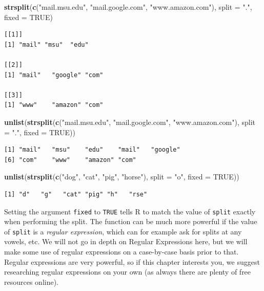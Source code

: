 \documentclass[
]{krantz}
\makeatletter
\newenvironment{Shaded}{\begin{snugshade}}{\end{snugshade}}
\newcommand{\DataTypeTok}[1]{\textcolor[rgb]{0.27,0.27,0.27}{#1}}
\newcommand{\KeywordTok}[1]{\textcolor[rgb]{0.27,0.27,0.27}{\textbf{#1}}}
\newcommand{\NormalTok}[1]{#1}
\newcommand{\OtherTok}[1]{\textcolor[rgb]{0.37,0.37,0.37}{#1}}
\newcommand{\StringTok}[1]{\textcolor[rgb]{0.5,0.5,0.5}{#1}}
\newenvironment{kframe}{%
\medskip{}
\setlength{\fboxsep}{.8em}
 \def\at@end@of@kframe{}%
 \ifinner\ifhmode%
  \def\at@end@of@kframe{\end{minipage}}%
  \begin{minipage}{\columnwidth}%
 \fi\fi%
 \def\FrameCommand##1{\hskip\@totalleftmargin \hskip-\fboxsep
 \colorbox{shadecolor}{##1}\hskip-\fboxsep
     \hskip-\linewidth \hskip-\@totalleftmargin \hskip\columnwidth}%
 \MakeFramed {\advance\hsize-\width
   \@totalleftmargin\z@ \linewidth\hsize
   \@setminipage}}%
 {\par\unskip\endMakeFramed%
 \at@end@of@kframe}
\renewenvironment{Shaded}{\begin{kframe}}{\end{kframe}}
\makeatother
\begin{document}
\begin{Shaded}
\begin{Highlighting}[]
\KeywordTok{strsplit}\NormalTok{(}\KeywordTok{c}\NormalTok{(}\StringTok{"mail.msu.edu"}\NormalTok{, }\StringTok{"mail.google.com"}\NormalTok{, }\StringTok{"www.amazon.com"}\NormalTok{),}
         \DataTypeTok{split =} \StringTok{"."}\NormalTok{, }\DataTypeTok{fixed =} \OtherTok{TRUE}\NormalTok{)}
\end{Highlighting}
\end{Shaded}

\begin{verbatim}
[[1]]
[1] "mail" "msu"  "edu" 

[[2]]
[1] "mail"   "google" "com"   

[[3]]
[1] "www"    "amazon" "com"   
\end{verbatim}

\begin{Shaded}
\begin{Highlighting}[]
\KeywordTok{unlist}\NormalTok{(}\KeywordTok{strsplit}\NormalTok{(}\KeywordTok{c}\NormalTok{(}\StringTok{"mail.msu.edu"}\NormalTok{, }\StringTok{"mail.google.com"}\NormalTok{, }\StringTok{"www.amazon.com"}\NormalTok{),}
                \DataTypeTok{split =} \StringTok{"."}\NormalTok{, }\DataTypeTok{fixed =} \OtherTok{TRUE}\NormalTok{))}
\end{Highlighting}
\end{Shaded}

\begin{verbatim}
[1] "mail"   "msu"    "edu"    "mail"   "google"
[6] "com"    "www"    "amazon" "com"   
\end{verbatim}

\begin{Shaded}
\begin{Highlighting}[]
\KeywordTok{unlist}\NormalTok{(}\KeywordTok{strsplit}\NormalTok{(}\KeywordTok{c}\NormalTok{(}\StringTok{"dog"}\NormalTok{, }\StringTok{"cat"}\NormalTok{, }\StringTok{"pig"}\NormalTok{, }\StringTok{"horse"}\NormalTok{), }
                \DataTypeTok{split =} \StringTok{"o"}\NormalTok{, }\DataTypeTok{fixed =} \OtherTok{TRUE}\NormalTok{))}
\end{Highlighting}
\end{Shaded}

\begin{verbatim}
[1] "d"   "g"   "cat" "pig" "h"   "rse"
\end{verbatim}

Setting the argument \texttt{fixed} to \texttt{TRUE} tells R to match the value of \texttt{split} exactly when performing the split. The function can be much more powerful if the value of \texttt{split} is a \emph{regular expression}, which can for example ask for splits at any vowels, etc. We will not go in depth on Regular Expressions here, but we will make some use of regular expressions on a case-by-case basis prior to that. Regular expressions are very powerful, so if this chapter interests you, we suggest researching regular expressions on your own (as always there are plenty of free resources online).
\end{document}
